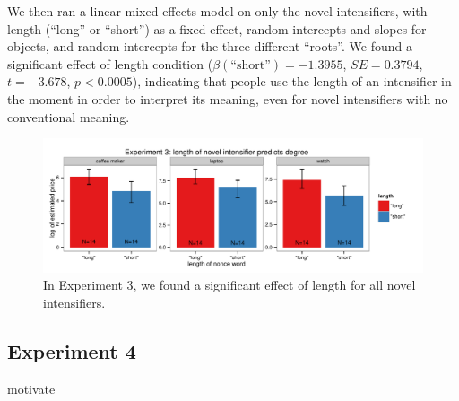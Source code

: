 \documentclass[a4paper,10pt]{article}
\newcommand{\todo}[1]{{\color{red}#1}}
\begin{document}

      We then ran a linear mixed effects model on only the novel intensifiers, with length (``long'' or ``short'') as a fixed effect, random intercepts and slopes for objects, and random intercepts for the three different ``roots''. We found a significant effect of length condition ($\beta(\mbox{``short''})=-1.3955$, $SE=0.3794$, $t=-3.678$, $p<0.0005$), indicating that people use the length of an intensifier in the moment in order to interpret its meaning, even for novel intensifiers with no conventional meaning.

      \begin{figure}[ht]
      \begin{center}
      \includegraphics[width=\textwidth]{free_response_nonce_intensifiers_length.pdf}
      \end{center}
      \caption{In Experiment 3, we found a significant effect of length for all novel intensifiers.} 
      \label{exp3_novel}
      \end{figure}

  \subsection{Experiment 4}
    \todo{motivate}
\end{document}
